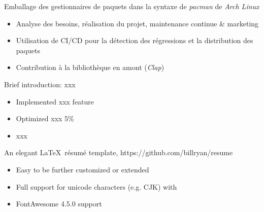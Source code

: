 \documentclass{resume}
\begin{document}
Emballage des gestionnaires de paquets dans la syntaxe de \textit{pacman} de \textit{Arch Linux}
\begin{itemize}
  \item Analyse des besoins, réalisation du projet, maintenance continue \& marketing
  \item Utilisation de CI/CD pour la détection des régressions et la distribution des paquets
  \item Contribution à la bibliothèque en amont (\textit{Clap})
\end{itemize}

Brief introduction: xxx
\begin{itemize}
  \item Implemented xxx feature
  \item Optimized xxx 5\%
  \item xxx
\end{itemize}

An elegant \LaTeX\ résumé template, https://github.com/billryan/resume
\begin{itemize}
  \item Easy to be further customized or extended
  \item Full support for unicode characters (e.g. CJK) with \XeLaTeX\
  \item FontAwesome 4.5.0 support
\end{itemize}


\end{document}
